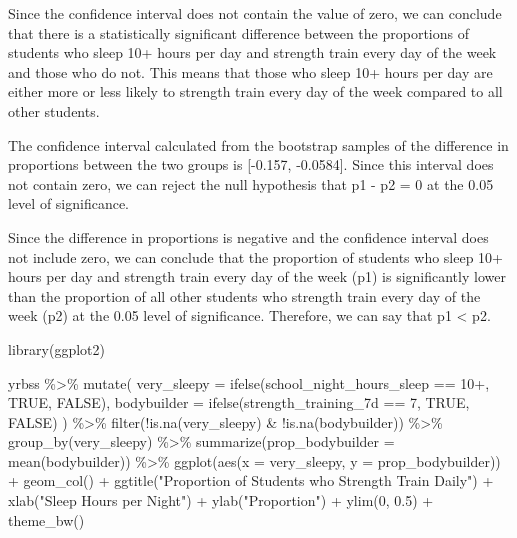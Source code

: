 \documentclass[
]{article}
\newenvironment{Shaded}{\begin{snugshade}}{\end{snugshade}}
\newcommand{\AttributeTok}[1]{\textcolor[rgb]{0.77,0.63,0.00}{#1}}
\newcommand{\ConstantTok}[1]{\textcolor[rgb]{0.00,0.00,0.00}{#1}}
\newcommand{\DecValTok}[1]{\textcolor[rgb]{0.00,0.00,0.81}{#1}}
\newcommand{\FloatTok}[1]{\textcolor[rgb]{0.00,0.00,0.81}{#1}}
\newcommand{\FunctionTok}[1]{\textcolor[rgb]{0.00,0.00,0.00}{#1}}
\newcommand{\NormalTok}[1]{#1}
\newcommand{\SpecialCharTok}[1]{\textcolor[rgb]{0.00,0.00,0.00}{#1}}
\newcommand{\StringTok}[1]{\textcolor[rgb]{0.31,0.60,0.02}{#1}}
\begin{document}
Since the confidence interval does not contain the value of zero, we can
conclude that there is a statistically significant difference between
the proportions of students who sleep 10+ hours per day and strength
train every day of the week and those who do not. This means that those
who sleep 10+ hours per day are either more or less likely to strength
train every day of the week compared to all other students.

The confidence interval calculated from the bootstrap samples of the
difference in proportions between the two groups is {[}-0.157,
-0.0584{]}. Since this interval does not contain zero, we can reject the
null hypothesis that p1 - p2 = 0 at the 0.05 level of significance.

Since the difference in proportions is negative and the confidence
interval does not include zero, we can conclude that the proportion of
students who sleep 10+ hours per day and strength train every day of the
week (p1) is significantly lower than the proportion of all other
students who strength train every day of the week (p2) at the 0.05 level
of significance. Therefore, we can say that p1 \textless{} p2.

\begin{Shaded}
\begin{Highlighting}[]
\FunctionTok{library}\NormalTok{(ggplot2)}

\NormalTok{yrbss }\SpecialCharTok{\%\textgreater{}\%}
  \FunctionTok{mutate}\NormalTok{(}
    \AttributeTok{very\_sleepy =} \FunctionTok{ifelse}\NormalTok{(school\_night\_hours\_sleep }\SpecialCharTok{==} \StringTok{\textquotesingle{}10+\textquotesingle{}}\NormalTok{, }\ConstantTok{TRUE}\NormalTok{, }\ConstantTok{FALSE}\NormalTok{),}
    \AttributeTok{bodybuilder =} \FunctionTok{ifelse}\NormalTok{(strength\_training\_7d }\SpecialCharTok{==} \StringTok{\textquotesingle{}7\textquotesingle{}}\NormalTok{, }\ConstantTok{TRUE}\NormalTok{, }\ConstantTok{FALSE}\NormalTok{)}
\NormalTok{  ) }\SpecialCharTok{\%\textgreater{}\%}
  \FunctionTok{filter}\NormalTok{(}\SpecialCharTok{!}\FunctionTok{is.na}\NormalTok{(very\_sleepy) }\SpecialCharTok{\&} \SpecialCharTok{!}\FunctionTok{is.na}\NormalTok{(bodybuilder)) }\SpecialCharTok{\%\textgreater{}\%}
  \FunctionTok{group\_by}\NormalTok{(very\_sleepy) }\SpecialCharTok{\%\textgreater{}\%}
  \FunctionTok{summarize}\NormalTok{(}\AttributeTok{prop\_bodybuilder =} \FunctionTok{mean}\NormalTok{(bodybuilder)) }\SpecialCharTok{\%\textgreater{}\%}
  \FunctionTok{ggplot}\NormalTok{(}\FunctionTok{aes}\NormalTok{(}\AttributeTok{x =}\NormalTok{ very\_sleepy, }\AttributeTok{y =}\NormalTok{ prop\_bodybuilder)) }\SpecialCharTok{+}
  \FunctionTok{geom\_col}\NormalTok{() }\SpecialCharTok{+}
  \FunctionTok{ggtitle}\NormalTok{(}\StringTok{"Proportion of Students who Strength Train Daily"}\NormalTok{) }\SpecialCharTok{+}
  \FunctionTok{xlab}\NormalTok{(}\StringTok{"Sleep Hours per Night"}\NormalTok{) }\SpecialCharTok{+}
  \FunctionTok{ylab}\NormalTok{(}\StringTok{"Proportion"}\NormalTok{) }\SpecialCharTok{+}
  \FunctionTok{ylim}\NormalTok{(}\DecValTok{0}\NormalTok{, }\FloatTok{0.5}\NormalTok{) }\SpecialCharTok{+}
  \FunctionTok{theme\_bw}\NormalTok{()}
\end{Highlighting}
\end{Shaded}
\end{document}
